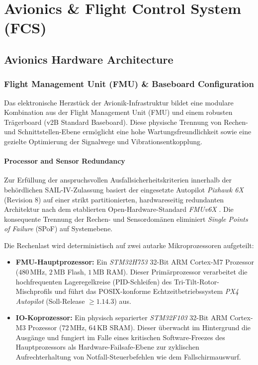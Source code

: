 ﻿\chapter{Avionics \& Flight Control System (FCS)}
\label{ch:avionics_fcs}

\section{Avionics Hardware Architecture}
\label{sec:avionics_hardware_architecture}

\subsection{Flight Management Unit (FMU) \texorpdfstring{\&}{\&} Baseboard Configuration}
\label{sec:fmu_baseboard_config}

Das elektronische Herzstück der Avionik-Infrastruktur bildet eine modulare Kombination aus der Flight Management Unit (FMU) und einem robusten Trägerboard 
(v2B Standard Baseboard). Diese physische Trennung von Rechen- und Schnittstellen-Ebene ermöglicht eine hohe Wartungsfreundlichkeit sowie eine 
gezielte Optimierung der Signalwege und Vibrationsentkopplung.

\subsubsection{Processor and Sensor Redundancy}
\label{sec:processor_sensor_redundancy}

Zur Erfüllung der anspruchsvollen Ausfallsicherheitskriterien innerhalb der behördlichen SAIL-IV-Zulassung basiert 
der eingesetzte Autopilot \textit{Pixhawk 6X} (Revision 8) auf einer strikt partitionierten, hardwareseitig redundanten Architektur 
nach dem etablierten Open-Hardware-Standard \textit{FMUv6X} \cite{holybro_pixhawk6x}. Die konsequente Trennung der 
Rechen- und Sensordomänen eliminiert \textit{Single Points of Failure} (SPoF) auf Systemebene.

Die Rechenlast wird deterministisch auf zwei autarke Mikroprozessoren aufgeteilt:
\begin{itemize}
    \item \textbf{FMU-Hauptprozessor:} Ein \textit{STM32H753} 32-Bit ARM Cortex-M7 Prozessor ($480\,\text{MHz}$, $2\,\text{MB}$ Flash, $1\,\text{MB}$ RAM). 
                                       Dieser Primärprozessor verarbeitet die hochfrequenten Lageregelkreise (PID-Schleifen) des Tri-Tilt-Rotor-Mischprofils 
                                       und führt das POSIX-konforme Echtzeitbetriebssystem \textit{PX4 Autopilot} (Soll-Release $\ge 1.14.3$) aus.
    \item \textbf{IO-Koprozessor:} Ein physisch separierter \textit{STM32F103} 32-Bit ARM Cortex-M3 Prozessor ($72\,\text{MHz}$, $64\,\text{KB}$ SRAM). 
                                   Dieser überwacht im Hintergrund die Ausgänge und fungiert im Falle eines kritischen Software-Freezes des Hauptprozessors 
                                   als Hardware-Failsafe-Ebene zur zyklischen Aufrechterhaltung von Notfall-Steuerbefehlen wie dem Fallschirmauswurf.
\end{itemize}

